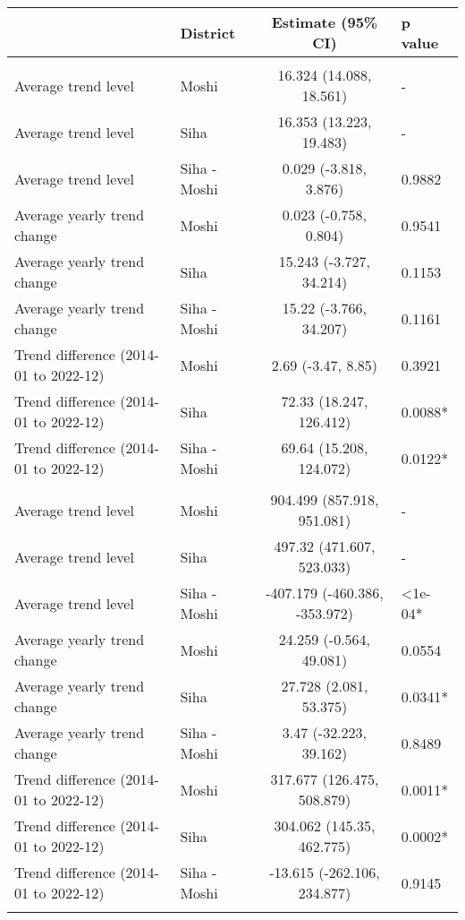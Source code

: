 \begin{longtable}{l|lcl}
\toprule
\multicolumn{1}{l}{} & District & Estimate (95\% CI) & p value \\ 
\midrule\addlinespace[2.5pt]
\multicolumn{4}{l}{Cancer} \\ 
\midrule\addlinespace[2.5pt]
Average trend level & Moshi & 16.324 (14.088, 18.561) & - \\ 
Average trend level & Siha & 16.353 (13.223, 19.483) & - \\ 
Average trend level & Siha - Moshi & 0.029 (-3.818, 3.876) & 0.9882 \\ 
Average yearly trend change & Moshi & 0.023 (-0.758, 0.804) & 0.9541 \\ 
Average yearly trend change & Siha & 15.243 (-3.727, 34.214) & 0.1153 \\ 
Average yearly trend change & Siha - Moshi & 15.22 (-3.766, 34.207) & 0.1161 \\ 
Trend difference (2014-01 to 2022-12) & Moshi & 2.69 (-3.47, 8.85) & 0.3921 \\ 
Trend difference (2014-01 to 2022-12) & Siha & 72.33 (18.247, 126.412) & 0.0088* \\ 
Trend difference (2014-01 to 2022-12) & Siha - Moshi & 69.64 (15.208, 124.072) & 0.0122* \\ 
\midrule\addlinespace[2.5pt]
\multicolumn{4}{l}{Cardiovascular Diseases} \\ 
\midrule\addlinespace[2.5pt]
Average trend level & Moshi & 904.499 (857.918, 951.081) & - \\ 
Average trend level & Siha & 497.32 (471.607, 523.033) & - \\ 
Average trend level & Siha - Moshi & -407.179 (-460.386, -353.972) & <1e-04* \\ 
Average yearly trend change & Moshi & 24.259 (-0.564, 49.081) & 0.0554 \\ 
Average yearly trend change & Siha & 27.728 (2.081, 53.375) & 0.0341* \\ 
Average yearly trend change & Siha - Moshi & 3.47 (-32.223, 39.162) & 0.8489 \\ 
Trend difference (2014-01 to 2022-12) & Moshi & 317.677 (126.475, 508.879) & 0.0011* \\ 
Trend difference (2014-01 to 2022-12) & Siha & 304.062 (145.35, 462.775) & 0.0002* \\ 
Trend difference (2014-01 to 2022-12) & Siha - Moshi & -13.615 (-262.106, 234.877) & 0.9145 \\ 
\midrule\addlinespace[2.5pt]
\multicolumn{4}{l}{Diabetes Mellitus} \\ 

\end{longtable}
